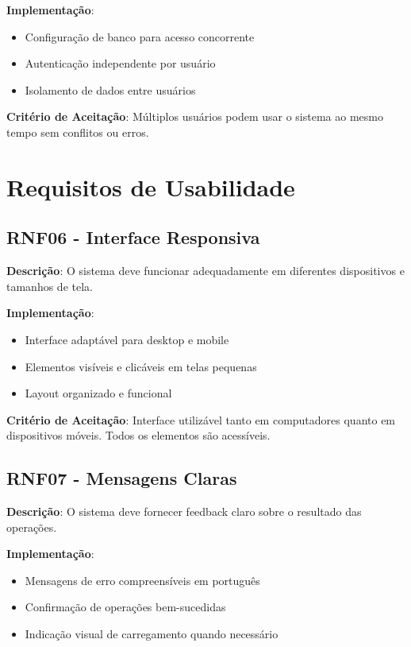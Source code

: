 \documentclass[12pt,a4paper]{article}
\begin{document}
\textbf{Implementação}:
\begin{itemize}
    \item Configuração de banco para acesso concorrente
    \item Autenticação independente por usuário
    \item Isolamento de dados entre usuários
\end{itemize}

\textbf{Critério de Aceitação}: Múltiplos usuários podem usar o sistema ao mesmo tempo sem conflitos ou erros.

\section{Requisitos de Usabilidade}

\subsection{RNF06 - Interface Responsiva}

\textbf{Descrição}: O sistema deve funcionar adequadamente em diferentes dispositivos e tamanhos de tela.

\textbf{Implementação}:
\begin{itemize}
    \item Interface adaptável para desktop e mobile
    \item Elementos visíveis e clicáveis em telas pequenas
    \item Layout organizado e funcional
\end{itemize}

\textbf{Critério de Aceitação}: Interface utilizável tanto em computadores quanto em dispositivos móveis. Todos os elementos são acessíveis.

\subsection{RNF07 - Mensagens Claras}

\textbf{Descrição}: O sistema deve fornecer feedback claro sobre o resultado das operações.

\textbf{Implementação}:
\begin{itemize}
    \item Mensagens de erro compreensíveis em português
    \item Confirmação de operações bem-sucedidas
    \item Indicação visual de carregamento quando necessário
\end{itemize}
\end{document}
